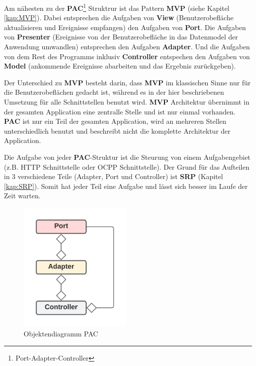 Am nähesten zu der \textbf{PAC}\footnote{Port-Adapter-Controller} Struktrur 
ist das Pattern \textbf{MVP} (siehe Kapitel \ref{kap:MVP}).
Dabei entsprechen die Aufgaben von \textbf{View} (Benutzerobefläche aktualisieren und Ereignisse empfangen) den Aufgaben von \textbf{Port}. 
Die Aufgaben von \textbf{Presenter} (Ereignisse von der Benutzerobefläche in das Datenmodel der Anwendung umwandlen) entsprechen den Aufgaben \textbf{Adapter}.
Und die Aufgaben von dem Rest des Programms inklusiv \textbf{Controller} entspechen den Aufgaben von \textbf{Model} (ankommende Ereignisse abarbeiten und das Ergebnis zurückgeben).

Der Unterschied zu \textbf{MVP} besteht darin, dass \textbf{MVP} im klassischen Sinne nur für die Benutzerobeflächen gedacht ist,
während es in der hier beschriebenen Umsetzung für alle Schnittstellen benutzt wird.
\textbf{MVP} Architektur übernimmt in der gesamten Application eine zentralle Stelle und ist nur einmal vorhanden.
\textbf{PAC} ist nur ein Teil der gesamten Application, wird an mehreren Stellen unterschiedlich benutzt und beschreibt nicht 
die komplette Architektur der Application.

Die Aufgabe von jeder \textbf{PAC}-Struktur ist die Steurung von einem Aufgabengebiet (z.B. HTTP Schnittstelle oder OCPP Schnittstelle).
Der Grund für das Aufteilen in 3 verschiedene Teile (Adapter, Port und Controller) ist
\textbf{SRP} (Kapitel \ref{kap:SRP}). Somit hat jeder Teil eine Aufgabe und lässt sich besser im Laufe der Zeit
warten. 


\begin{figure}[H]
   \centering
   \includegraphics[width=5.5cm]{./images/Port-Adapter-Contoller.png}
    \caption[Objektendiagramm PAC]{Objektendiagramm PAC}
    \label{fig:CDPAC}
\end{figure}